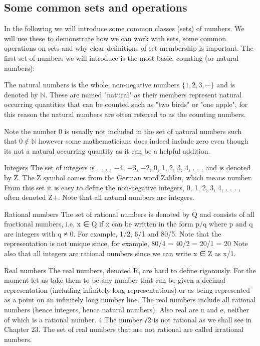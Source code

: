 \subsection{Some common sets and operations}
In the following we will introduce some common classes (sets) of numbers. We will use these to demonstrate how we can work with sets, some common operations on sets and why clear definitions of set membership is important. The first set of numbers we will introduce is the most basic, counting (or natural numbers):
\begin{definition}
The natural numbers is the whole, non-negative numbers $\{1,2,3, \cdots\}$ and is denoted by $\mathbb{N}$. These are named "natural" as their members represent natural occurring quantities that can be counted such as "two birds" or "one apple", for this reason the natural numbers are often referred to as the counting numbers.  
\end{definition}
Note the number $0$ is usually not included in the set of natural numbers such that $0 \notin  \mathbb{N}$ however some mathematicians does indeed include zero even though its not a natural occurring quantity as it can be a helpful addition.


Integers
The set of integers is {. . . , −4, −3, −2, 0, 1, 2, 3, 4, . . . } and is denoted by Z. The Z symbol comes from the German word Zahlen, which means number. From this set it is easy to define the non-negative integers, {0, 1, 2, 3, 4, . . . }, often denoted Z+. Note that all natural numbers are integers.

Rational numbers
The set of rational numbers is denoted by Q and consists of all fractional numbers, i.e. x ∈ Q if x can be written in the form p/q where p and q are integers with q ≠ 0. For example, 1/2, 6/1 and 80/5. Note that the representation is not unique since, for example, 80/4 = 40/2 = 20/1 = 20 Note also that all integers are rational numbers since we can write x ∈ Z as x/1.

Real numbers
The real numbers, denoted R, are hard to define rigorously. For the moment let us take them to be any number that can be given a decimal representation (including infinitely long representations) or as being represented as a point on an infinitely long number line. The real numbers include all rational numbers (hence integers, hence natural numbers). Also real are π and e, neither of which is a rational number. 4 The number √2 is not rational as we shall see in Chapter 23. The set of real numbers that are not rational are called irrational numbers.

